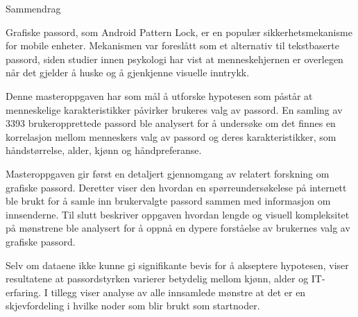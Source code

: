 {\centering 

	{\Huge Sammendrag}

	\vspace{1cm}

	Grafiske passord, som Android Pattern Lock, er en populær sikkerhetsmekanisme for mobile enheter. Mekanismen var foreslått som et alternativ til tekstbaserte passord, siden studier innen psykologi har vist at menneskehjernen er overlegen når det gjelder å huske og å gjenkjenne visuelle inntrykk.

	Denne masteroppgaven har som mål å utforske hypotesen som påstår at menneskelige karakteristikker påvirker brukeres valg av passord. En samling av 3393 brukeropprettede passord ble analysert for å undersøke om det finnes en korrelasjon mellom menneskers valg av passord og deres karakteristikker, som håndstørrelse, alder, kjønn og håndpreferanse.

	Masteroppgaven gir først en detaljert gjennomgang av relatert forskning om grafiske passord. Deretter viser den hvordan en spørreundersøkelese på internett ble brukt for å samle inn brukervalgte passord sammen med informasjon om innsenderne. Til slutt beskriver oppgaven hvordan lengde og visuell kompleksitet på mønstrene ble analysert for å oppnå en dypere forståelse av brukernes valg av grafiske passord.

	Selv om dataene ikke kunne gi signifikante bevis for å akseptere hypotesen, viser resultatene at passordstyrken varierer betydelig mellom kjønn, alder og IT-erfaring. I tillegg viser analyse av alle innsamlede mønstre at det er en skjevfordeling i hvilke noder som blir brukt som startnoder. 
}

	

